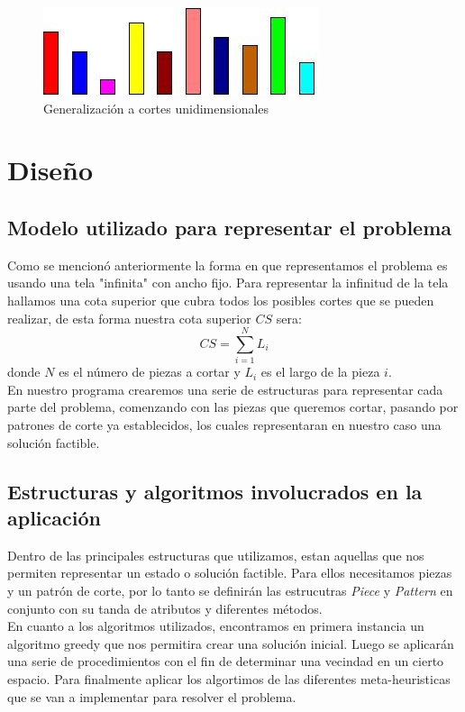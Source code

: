 \documentclass[letterpaper,11pt]{article}
\begin{document}
\begin{figure}[htp]
\centering
\includegraphics[scale=0.7]{Untitled.jpg}
\caption{Generalizaci\'on a cortes unidimensionales}
\end{figure}

\newpage

\section{Dise\~no}

\subsection{Modelo utilizado para representar el problema}

Como se mencion\'o anteriormente la forma en que representamos el problema es usando una tela "infinita" con
ancho fijo. Para representar la infinitud de la tela hallamos una cota superior que cubra todos los posibles
cortes que se pueden realizar, de esta forma nuestra cota superior $CS$ sera: $$ CS =  \sum_{i = 1}^{N} L_i $$ 
donde $N$ es el n\'umero de piezas a cortar y $L_i$ es el largo de la pieza $i$.\\
En nuestro programa crearemos una serie de estructuras para representar cada parte del problema, comenzando con las
piezas que queremos cortar, pasando por patrones de corte ya establecidos, los cuales representaran en
nuestro caso una soluci\'on factible.

\subsection{Estructuras y algoritmos involucrados en la aplicaci\'on}

Dentro de las principales estructuras que utilizamos, estan aquellas que nos permiten representar
un estado o soluci\'on factible. Para ellos necesitamos piezas y un patr\'on de corte, por lo tanto
se definir\'an las estrucutras \emph{Piece} y \emph{Pattern} en conjunto con su tanda de atributos
y diferentes m\'etodos.\\

En cuanto a los algoritmos utilizados, encontramos en primera instancia un algoritmo greedy que nos
permitira crear una soluci\'on inicial. Luego se aplicar\'an una serie de procedimientos con el fin de
determinar una vecindad en un cierto espacio. Para finalmente aplicar los algortimos de las diferentes
meta-heuristicas que se van a implementar para resolver el problema.\\
\end{document}
